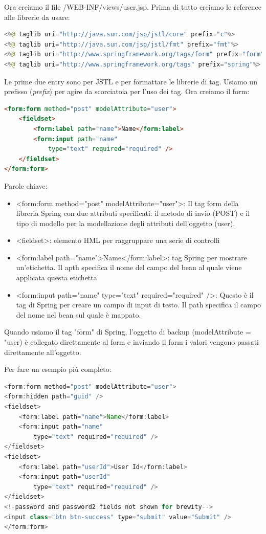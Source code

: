 \documentclass[11pt,a4paper]{book}
\begin{document}
Ora creiamo il file /WEB-INF/views/user.jsp.
Prima di tutto creiamo le reference alle librerie da usare:
\begin{lstlisting}[language = java]
<%@ taglib uri="http://java.sun.com/jsp/jstl/core" prefix="c"%>
<%@ taglib uri="http://java.sun.com/jsp/jstl/fmt" prefix="fmt"%>
<%@ taglib uri="http://www.springframework.org/tags/form" prefix="form"%>
<%@ taglib uri="http://www.springframework.org/tags" prefix="spring"%>
\end{lstlisting}
Le prime due entry sono per JSTL e per formattare le librerie di tag. Usiamo un prefisso (\emph{prefix}) per agire da scorciatoia per l'uso dei tag.
Ora creiamo il form:
\begin{lstlisting}[language = HTML]
<form:form method="post" modelAttribute="user">
	<fieldset>
		<form:label path="name">Name</form:label>
		<form:input path="name"
			type="text" required="required" />
	</fieldset>
</form:form>
\end{lstlisting}
Parole chiave:
\begin{itemize}
	\item <form:form method="post" modelAttribute="user">: Il tag form della libreria Spring con due attributi specificati: il metodo di invio (POST)  e il tipo di modello per la modellazione degli attributi dell'oggetto (user).
	\item <fieldset>: elemento HML per raggruppare una serie di controlli
	\item <form:label path="name">Name</form:label>: tag Spring per mostrare un'etichetta. Il apth specifica il nome del campo del bean al quale viene applicata questa etichetta
	\item <form:input path="name" type="text" required="required" />: Questo è il tag di Spring per creare un campo di input di testo. Il path specifica il campo del nome nel bean sul quale è mappato.
\end{itemize}
Quando usiamo il tag "form" di Spring, l'oggetto di backup (modelAttribute = "user) è collegato direttamente al form e inviando il form i valori vengono passati direttamente all'oggetto.

Per fare un esempio più completo:
\begin{lstlisting}[language = Java]
<form:form method="post" modelAttribute="user">
<form:hidden path="guid" />
<fieldset>
	<form:label path="name">Name</form:label>
	<form:input path="name"
		type="text" required="required" />
</fieldset>
<fieldset>
	<form:label path="userId">User Id</form:label>
	<form:input path="userId"
		type="text" required="required" />
</fieldset>
<!-password and password2 fields not shown for brewity-->
<input class="btn btn-success" type="submit" value="Submit" />
</form:form>
\end{lstlisting}
\end{document}
